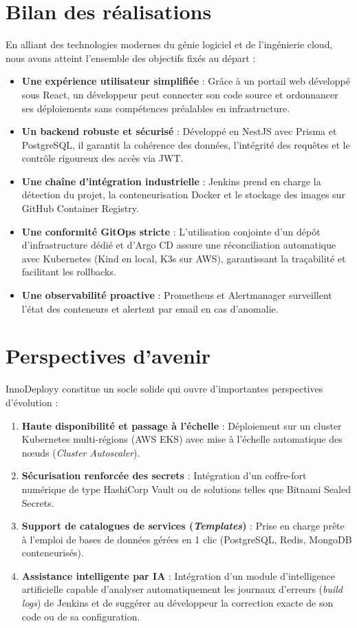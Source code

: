\documentclass[12pt,a4paper,oneside]{report}
\begin{document}
\section*{Bilan des réalisations}
En alliant des technologies modernes du génie logiciel et de l'ingénierie cloud, nous avons atteint l'ensemble des objectifs fixés au départ :
\begin{itemize}[label=$\bullet$]
    \item \textbf{Une expérience utilisateur simplifiée} : Grâce à un portail web développé sous React, un développeur peut connecter son code source et ordonnancer ses déploiements sans compétences préalables en infrastructure.
    \item \textbf{Un backend robuste et sécurisé} : Développé en NestJS avec Prisma et PostgreSQL, il garantit la cohérence des données, l'intégrité des requêtes et le contrôle rigoureux des accès via JWT.
    \item \textbf{Une chaîne d'intégration industrielle} : Jenkins prend en charge la détection du projet, la conteneurisation Docker et le stockage des images sur GitHub Container Registry.
    \item \textbf{Une conformité GitOps stricte} : L'utilisation conjointe d'un dépôt d'infrastructure dédié et d'Argo CD assure une réconciliation automatique avec Kubernetes (Kind en local, K3s sur AWS), garantissant la traçabilité et facilitant les rollbacks.
    \item \textbf{Une observabilité proactive} : Prometheus et Alertmanager surveillent l'état des conteneurs et alertent par email en cas d'anomalie.
\end{itemize}

\section*{Perspectives d'avenir}
InnoDeployy constitue un socle solide qui ouvre d'importantes perspectives d'évolution :
\begin{enumerate}
    \item \textbf{Haute disponibilité et passage à l'échelle} : Déploiement sur un cluster Kubernetes multi-régions (AWS EKS) avec mise à l'échelle automatique des nœuds (\textit{Cluster Autoscaler}).
    \item \textbf{Sécurisation renforcée des secrets} : Intégration d'un coffre-fort numérique de type HashiCorp Vault ou de solutions telles que Bitnami Sealed Secrets.
    \item \textbf{Support de catalogues de services (\textit{Templates})} : Prise en charge prête à l'emploi de bases de données gérées en 1 clic (PostgreSQL, Redis, MongoDB conteneurisés).
    \item \textbf{Assistance intelligente par IA} : Intégration d'un module d'intelligence artificielle capable d'analyser automatiquement les journaux d'erreurs (\textit{build logs}) de Jenkins et de suggérer au développeur la correction exacte de son code ou de sa configuration.
\end{enumerate}
\end{document}
